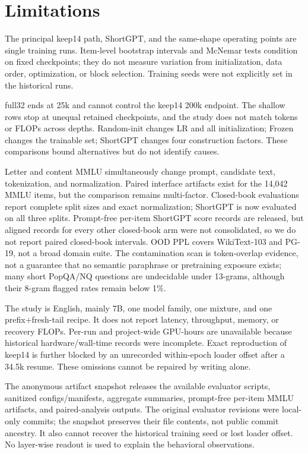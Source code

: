 \section*{Limitations}

The principal keep14 path, ShortGPT, and the same-shape operating points are
single training runs. Item-level bootstrap intervals and McNemar tests condition
on fixed checkpoints; they do not measure variation from initialization, data
order, optimization, or block selection. Training seeds were not explicitly
set in the historical runs.

full32 ends at 25k and cannot control the keep14 200k endpoint. The shallow rows stop at unequal retained checkpoints, and the study does not match tokens or FLOPs across depths.
Random-init changes LR and all initialization; Frozen changes the trainable
set; ShortGPT changes four construction factors. These comparisons bound
alternatives but do not identify causes.

Letter and content MMLU simultaneously change prompt, candidate text,
tokenization, and normalization. Paired interface artifacts exist for the
14,042 MMLU items, but the comparison remains multi-factor. Closed-book
evaluations report complete split sizes and exact normalization; ShortGPT is
now evaluated on all three splits. Prompt-free per-item ShortGPT score records
are released, but aligned records for every other closed-book arm were not
consolidated, so we do not report paired closed-book intervals. OOD PPL covers
WikiText-103 and PG-19, not a broad domain suite. The contamination scan is
token-overlap evidence, not a guarantee that no semantic paraphrase or
pretraining exposure exists; many short PopQA/NQ questions are undecidable
under 13-grams, although their 8-gram flagged rates remain below 1\%.

The study is English, mainly 7B, one model family, one mixture, and one
prefix+fresh-tail recipe. It does not report latency, throughput, memory, or
recovery FLOPs. Per-run and project-wide GPU-hours are unavailable because
historical hardware/wall-time records were incomplete. Exact reproduction of
keep14 is further blocked by an unrecorded within-epoch loader offset after a
34.5k resume. These omissions cannot be repaired by writing alone.

The anonymous artifact snapshot releases the available evaluator scripts,
sanitized configs/manifests, aggregate summaries, prompt-free per-item MMLU
artifacts, and paired-analysis outputs. The original evaluator revisions were
local-only commits; the snapshot preserves their file contents, not public
commit ancestry. It also cannot recover the historical training seed or lost
loader offset. No layer-wise readout is used to explain the behavioral
observations.
